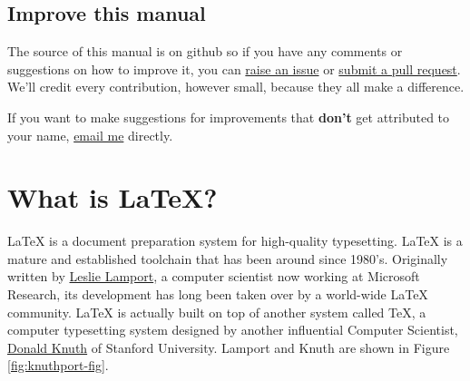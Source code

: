 \documentclass[
]{book}
\begin{document}
\hypertarget{improve-this-manual}{%
\section*{Improve this manual}\label{improve-this-manual}}

The source of this manual is on github so if you have any comments or suggestions on how to improve it, you can \href{https://github.com/dullhunk/lateX4year1/issues}{raise an issue} or \href{https://github.com/dullhunk/LaTeX4year1/pulls}{submit a pull request}. We'll credit every contribution, however small, because they all make a difference.

If you want to make suggestions for improvements that \textbf{don't} get attributed to your name, \href{http://www.cs.man.ac.uk/~hulld/contact.html}{email me} directly.

\hypertarget{latex}{%
\chapter{What is LaTeX?}\label{latex}}

LaTeX is a document preparation system for high-quality typesetting. \citep{latexproject} LaTeX is a mature and established toolchain that has been around since 1980's. \citep{knuth} Originally written by \href{https://en.wikipedia.org/wiki/Leslie_Lamport}{Leslie Lamport}, a computer scientist
now working at Microsoft Research, its development has long been taken over by a world-wide LaTeX community. LaTeX is actually built on top of another system called TeX, a computer typesetting system designed by another influential Computer Scientist, \href{https://en.wikipedia.org/wiki/Donald_Knuth}{Donald Knuth} of Stanford University. Lamport and Knuth are shown in Figure \ref{fig:knuthport-fig}.
\end{document}
